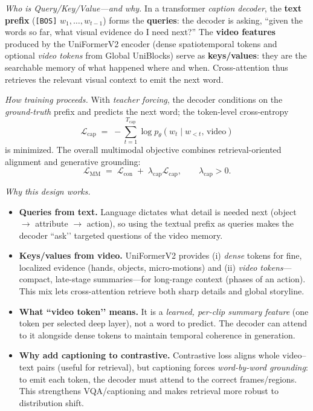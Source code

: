 \begin{enrichment}
\begin{enrichment}
        \emph{Who is Query/Key/Value—and why.} In a transformer \emph{caption decoder}, the \textbf{text prefix} (\texttt{[BOS]} $w_1,\dots,w_{t-1}$) forms the \textbf{queries}: the decoder is asking, “given the words so far, what visual evidence do I need next?” The \textbf{video features} produced by the UniFormerV2 encoder (dense spatiotemporal tokens and optional \emph{video tokens} from Global UniBlocks) serve as \textbf{keys/values}: they are the searchable memory of what happened where and when. Cross-attention thus retrieves the relevant visual context to emit the next word.
        
        \emph{How training proceeds.} With \emph{teacher forcing}, the decoder conditions on the \emph{ground-truth} prefix and predicts the next word; the token-level cross-entropy
        \[
        \mathcal{L}_{\mathrm{cap}} \;=\; -\sum_{t=1}^{T_{\text{cap}}} \log p_\theta(w_t \mid w_{<t},\,\text{video})
        \]
        is minimized. The overall multimodal objective combines retrieval-oriented alignment and generative grounding:
        \[
        \mathcal{L}_{\mathrm{MM}} \;=\; \mathcal{L}_{\mathrm{con}} \;+\; \lambda_{\mathrm{cap}}\mathcal{L}_{\mathrm{cap}} ,\qquad \lambda_{\mathrm{cap}}>0.
        \]
        
        \newpage
        
        \emph{Why this design works.}
        \begin{itemize}
            \item \textbf{Queries from text.} Language dictates what detail is needed next (object $\rightarrow$ attribute $\rightarrow$ action), so using the textual prefix as queries makes the decoder “ask’’ targeted questions of the video memory. 
            \item \textbf{Keys/values from video.} UniFormerV2 provides (i) \emph{dense} tokens for fine, localized evidence (hands, objects, micro-motions) and (ii) \emph{video tokens}—compact, late-stage summaries—for long-range context (phases of an action). This mix lets cross-attention retrieve both sharp details and global storyline. 
            \item \textbf{What “video token’’ means.} It is a \emph{learned, per-clip summary feature} (one token per selected deep layer), not a word to predict. The decoder can attend to it alongside dense tokens to maintain temporal coherence in generation.
            \item \textbf{Why add captioning to contrastive.} Contrastive loss aligns whole video–text pairs (useful for retrieval), but captioning forces \emph{word-by-word grounding}: to emit each token, the decoder must attend to the correct frames/regions. This strengthens VQA/captioning and makes retrieval more robust to distribution shift.
        \end{itemize}
        

\end{enrichment}
\end{enrichment}

